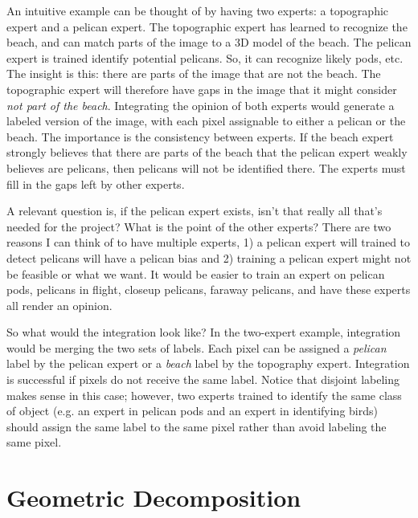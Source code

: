 An intuitive example can be thought of by having two experts: a topographic
expert and a pelican expert. The topographic expert has learned to recognize
the beach, and can match parts of the image to a 3D model of the beach. The
pelican expert is trained identify potential pelicans. So, it can recognize
likely pods, etc. The insight is this: there are parts of the image that are
not the beach. The topographic expert will therefore have gaps in the image
that it might consider \emph{not part of the beach}. Integrating the opinion of
both experts would generate a labeled version of the image, with each pixel
assignable to either a pelican or the beach. The importance is the consistency
between experts. If the beach expert strongly believes that there are parts of
the beach that the pelican expert weakly believes are pelicans, then pelicans
will not be identified there. The experts must fill in the gaps left by other
experts.


A relevant question is, if the pelican expert exists, isn't that really all
that's needed for the project? What is the point of the other experts? There
are two reasons I can think of to have multiple experts, 1) a pelican expert
will trained to detect pelicans will have a pelican bias and 2) training a
pelican expert might not be feasible or what we want. It would be easier to
train an expert on pelican pods, pelicans in flight, closeup pelicans, faraway
pelicans, and have these experts all render an opinion.

So what would the integration look like? In the two-expert example, integration
would be merging the two sets of labels. Each pixel can be assigned a
\emph{pelican} label by the pelican expert or a \emph{beach} label by the
topography expert. Integration is successful if pixels do not receive the same
label. Notice that disjoint labeling makes sense in this case; however, two
experts trained to identify the same class of object (e.g. an expert in pelican
pods and an expert in identifying birds) should assign the same label to the
same pixel rather than avoid labeling the same pixel.

\section{Geometric Decomposition}

